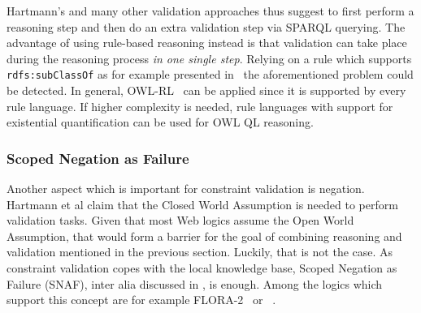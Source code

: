 Hartmann's and many other validation approaches thus suggest to first perform a reasoning step and then do an extra validation step via SPARQL querying. 
The advantage of using rule-based reasoning instead is
that validation can take place during the reasoning process \emph{in one single step}. 
Relying on a rule which supports \texttt{rdfs:subClassOf} as for example presented 
in~\cite{arndt_ruleml_industry_2015} the aforementioned problem could be detected.
In general, OWL-RL~\cite{OWLRL} can be applied since it is supported by every rule language.
If higher complexity is needed, rule languages with support for existential quantification can be used for OWL QL reasoning.


\subsubsection{Scoped Negation as Failure}
Another aspect which is important for constraint validation is negation.
Hartmann et al claim that the Closed World Assumption is needed to perform validation tasks.
Given that most Web logics assume the Open World Assumption, that would form a barrier for the goal of combining reasoning and validation 
mentioned in the previous section. Luckily, that is not the case.
As constraint validation copes with the local knowledge base,
Scoped Negation as Failure (SNAF), 
inter alia discussed in \cite{damasio2006supporting,kifer2005,polleres2006rules}, is enough.
Among the logics which support this concept are for example FLORA-2~\cite{negflora} or \nthreelogic~\cite{N3Logic}.

